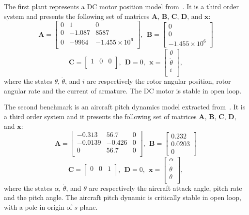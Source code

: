 \documentclass[runningheads,a4paper]{llncs}
\begin{document}
The first plant represents a DC motor position model from~\cite{CTMS}. It is a third order system and presents the following set of matrices $\textbf{A}$, $\textbf{B}$, $\textbf{C}$, $\textbf{D}$, and $\textbf{x}$:
$$
\textbf{A}=\left[\begin{array}{ccc}
0		& 1 		& 0						\\
0 		& -1.087	& 8587					\\
0		& -9964		& -1.455\times 10^{6}	\\
\end{array}\right],~~ \textbf{B} = \left[\begin{array}{c}
0 \\ 0 \\ -1.455\times10^{6}
\end{array}\right]
$$
%
$$
\textbf{C}=\left[\begin{array}{ccc}
1 & 0 & 0\\
\end{array}\right],~~ \textbf{D}= 0,~~ \textbf{x}=\left[\begin{array}{c}
\theta \\ \dot{\theta} \\ i \\
\end{array}\right],
$$
where the states $\theta$, $\dot{\theta}$, and $i$ are respectively the rotor angular position, rotor angular rate and the current of armature. The DC motor is stable in open loop.

The second benchmark is an aircraft pitch dynamics model extracted from~\cite{CTMS}. It is a third order system and it presents the following set of matrices $\textbf{A}$, $\textbf{B}$, $\textbf{C}$, $\textbf{D}$, and $\textbf{x}$:
$$
\textbf{A}=\left[\begin{array}{ccc}
-0.313	& 56.7 		& 0		\\
-0.0139	& -0.426	& 0		\\
0		& 56.7		& 0		\\
\end{array}\right],~~ \textbf{B} = \left[\begin{array}{c}
0.232 \\ 0.0203 \\ 0
\end{array}\right]
$$
%
$$
\textbf{C}=\left[\begin{array}{ccc}
0 & 0 & 1\\
\end{array}\right],~~ \textbf{D}= 0,~~ \textbf{x}=\left[\begin{array}{c}
\alpha \\ \dot{\theta} \\ \theta \\
\end{array}\right],
$$
where the states $\alpha$, $\dot{\theta}$, and $\theta$ are respectively the aircraft attack angle, pitch rate and the pitch angle. The aircraft pitch dynamic is critically stable in open loop, with a pole in origin of $s$-plane.
\end{document}
